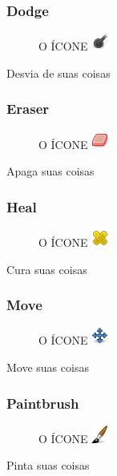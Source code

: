 \documentclass[12pt,onecolumn]{article}
\begin{document}
    \subsubsection{Dodge}
      \begin{figure}[H]
        O ÍCONE
        \includegraphics{gimp-icons/stock-tool-dodge-22.png}
        \label{fig:dodge}
      \end{figure}
      Desvia de suas coisas

    \subsubsection{Eraser}
      \begin{figure}[H]
        O ÍCONE
        \includegraphics{gimp-icons/stock-tool-eraser-22.png}
        \label{fig:eraser}
      \end{figure}
      Apaga suas coisas

    \subsubsection{Heal}
      \begin{figure}[H]
        O ÍCONE
        \includegraphics{gimp-icons/stock-tool-heal-22.png}
        \label{fig:heal}
      \end{figure}
      Cura suas coisas

    \subsubsection{Move}
      \begin{figure}[H]
        O ÍCONE
        \includegraphics{gimp-icons/stock-tool-move-22.png}
        \label{fig:move}
      \end{figure}
      Move suas coisas

    \subsubsection{Paintbrush}
      \begin{figure}[H]
        O ÍCONE
        \includegraphics{gimp-icons/stock-tool-paintbrush-22.png}
        \label{fig:brush}
      \end{figure}
      Pinta suas coisas
      
\end{document}
